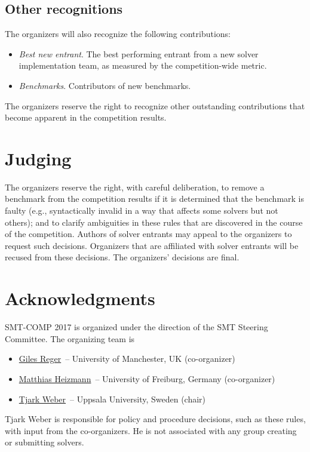 \documentclass[12pt]{article}
\begin{document}
\subsection{Other recognitions}

The organizers will also recognize the following contributions:
%
\begin{itemize}
\item \emph{Best new entrant}. The best performing entrant from a new
  solver implementation team, as measured by the competition-wide
  metric.
\item \emph{Benchmarks}. Contributors of new benchmarks.
\end{itemize}
%
The organizers reserve the right to recognize other outstanding
contributions that become apparent in the competition results.


\section{Judging}

The organizers reserve the right, with careful deliberation, to remove
a benchmark from the competition results if it is determined that the
benchmark is faulty (e.g., syntactically invalid in a way that affects
some solvers but not others); and to clarify ambiguities in these
rules that are discovered in the course of the competition.  Authors
of solver entrants may appeal to the organizers to request such
decisions.  Organizers that are affiliated with solver entrants will
be recused from these decisions.  The organizers' decisions are final.


\section{Acknowledgments}

SMT-COMP 2017 is organized under the direction of the SMT Steering
Committee. The organizing team is
%
\begin{itemize}
\setlength{\itemsep}{0pt}
\item \href{http://www.cs.man.ac.uk/~regerg/}{Giles Reger}~--
  University of Manchester, UK (co-organizer)
\item
  \href{https://swt.informatik.uni-freiburg.de/staff/heizmann}{Matthias
    Heizmann}~-- University of Freiburg, Germany (co-organizer)
\item \href{http://user.it.uu.se/~tjawe125/}{Tjark Weber}~-- Uppsala
  University, Sweden (chair)
\end{itemize}
%
Tjark Weber is responsible for policy and procedure decisions, such as
these rules, with input from the co-organizers. He is not associated
with any group creating or submitting solvers.
\end{document}
